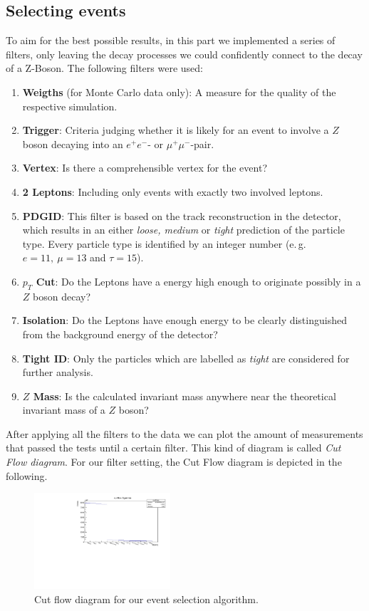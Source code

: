 \documentclass[twocolumn,
			   showpacs,%
               nofootinbib,
               aps,%
               prd,
               notitlepage,
               showkeys,
               10pt]{revtex4-1}
\begin{document}
\subsection{Selecting events}
To aim for the best possible results, in this part we implemented a series of filters, only leaving the decay processes we could confidently connect to the decay of a Z-Boson.
The following filters were used:
\begin{enumerate}
\item \textbf{Weigths} (for Monte Carlo data only): A measure for the quality of the respective simulation.
\item \textbf{Trigger}: Criteria judging whether it is likely for an event to involve a $Z$ boson decaying into an $e^{+}e^{-}$- or $\mu^{+}\mu^{-}$-pair.
\item \textbf{Vertex}: Is there a comprehensible vertex for the event?
\item \textbf{2 Leptons}: Including only events with exactly two involved leptons.
\item \textbf{PDGID}: This filter is based on the track reconstruction in the detector, which results in an either \textit{loose, medium} or \textit{tight} prediction of the particle type. Every particle type is identified by an integer number (e.\,g. $e = 11 , \ \mu = 13$ and $\tau = 15$).
\item \textbf{$p_T$ Cut}: Do the Leptons have a energy high enough to originate possibly in a $Z$ boson decay?
\item \textbf{Isolation}: Do the Leptons have enough energy to be clearly distinguished from the background energy of the detector? 
\item \textbf{Tight ID}: Only the particles which are labelled as \textit{tight} are considered for further analysis.
\item \textbf{$Z$ Mass}: Is the calculated invariant mass anywhere near the theoretical invariant mass of a $Z$ boson?
\end{enumerate}

After applying all the filters to the data we can plot the amount of measurements that passed the tests until a certain  filter. This kind of diagram is called \textit{Cut Flow diagram}. For our filter setting, the Cut Flow diagram is depicted in the following.
\begin{figure}[H]
\centering
\includegraphics[width = 0.45\textwidth]
{figures/plots/CutFlow}
\caption{Cut flow diagram for our event selection algorithm.}	
\end{figure}
\end{document}
